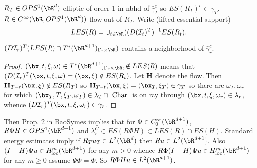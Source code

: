 $R_T \in OPS^1(\bR^d)$ elliptic of order 1 in nbhd of $\bar{\gamma}_T^c$ so $ES(R_T)^c \subset \gamma_T$. $R \in C^{\infty}(\bR, OPS^1(\bR^d))$ flow-out of $R_T$. Write (lifted essential support) 
\[
LES(R) = \cup_{t \in \bR} ((D({\cal I}_t)^T)^{-1}ES(R_t). 
\]
\begin{lemma}
\label{thm:lem1} $(D{\cal I}_r)^T (LES(R) \cap T^*(\bR^{d+1})_{\Gamma_r \times \bR})$ contains a neighborhood of $\bar{\gamma}_r^c$.
\end{lemma}
\begin{proof}
$(\bx,t,\xi,\omega) \in T^*(\bR^{d+1})_{\Gamma_r \times \bR}, \notin LES(R)$ means that $(D({\cal I}_r)^T(\bx,t,\xi,\omega) = (\bx,\xi) \notin ES(R_t)$. Let ${\bf H}$ denote the flow. Then ${\bf H}_{T-t}(\bx,\xi) \notin ES(R_T)$ so ${\bf H}_{T-t}(\bx,\xi) = (\bx_T,\xi_T) \in \gamma_T$ so there are $\omega_T, \omega_r$ for which $(\bx_T,T,\xi_T,\omega_T) \in \lambda_T \cap \mbox{ Char }$ is on ray through $(\bx,t,\xi,\omega_r) \in \lambda_r$, whence $(D{\cal I}_r)^T (\bx,t,\xi,\omega_r) \in \gamma_r$.
\end{proof}

Then Prop. 2 in BaoSymes implies that for $ \Phi \in C_0^{\infty}(\bR^{d+1})$, $R\Phi H \in OPS^1(\bR^{d+1})$ and $ \lambda_r^C \subset ES(R\Phi H) \subset LES(R) \cap ES(H)$. Standard energy estimates imply if $R_Tu_T \in L^2(\bR^d)$ then $Ru \in L^2(\bR^{d+1})$. Also $(I-H)\Psi u \in H^m_{\rm loc}(\bR^{d+1})$ for any $m>0$ whence $R\Phi(I-H)\Psi u \in H^m_{\rm loc}(\bR^{d+1})$ for any $m \ge 0$ assume $\Psi \Phi = \Phi $. So $R\Phi Hu \in L^2(\bR^{d+1})$.



